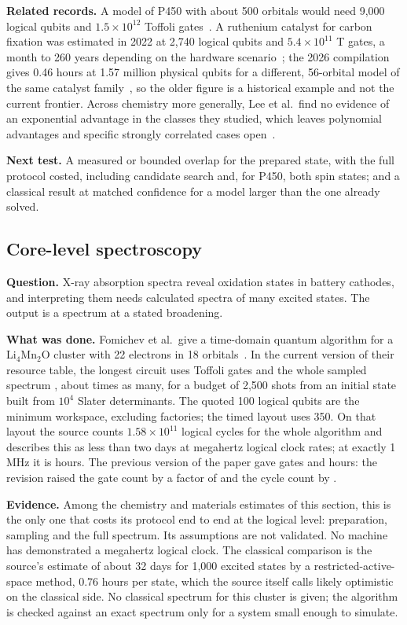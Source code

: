 \documentclass[10pt,a4paper]{article}
\begin{document}
\textbf{Related records.} A model of P450 with about 500 orbitals would need 9{,}000 logical qubits and $1.5\times10^{12}$ Toffoli gates~\cite{goings2022}. A ruthenium catalyst for carbon fixation was estimated in 2022 at 2{,}740 logical qubits and $5.4\times10^{11}$ T gates, a month to 260 years depending on the hardware scenario~\cite{beverland2022}; the 2026 compilation gives 0.46 hours at 1.57 million physical qubits for a different, 56-orbital model of the same catalyst family~\cite{low2026dense}, so the older figure is a historical example and not the current frontier. Across chemistry more generally, Lee et al.\ find no evidence of an exponential advantage in the classes they studied, which leaves polynomial advantages and specific strongly correlated cases open~\cite{lee2023}.

\textbf{Next test.} A measured or bounded overlap for the prepared state, with the full protocol costed, including candidate search and, for P450, both spin states; and a classical result at matched confidence for a model larger than the one already solved.

\subsection{Core-level spectroscopy}
\label{sec:xas}
\textbf{Question.} X-ray absorption spectra reveal oxidation states in battery cathodes, and interpreting them needs calculated spectra of many excited states. The output is a spectrum at a stated broadening.

\textbf{What was done.} Fomichev et al.\ give a time-domain quantum algorithm for a Li$_4$Mn$_2$O cluster with 22 electrons in 18 orbitals~\cite{fomichev2025}. In the current version of their resource table, the longest circuit uses \xasCirc{} Toffoli gates and the whole sampled spectrum \xasAlg{}, about \xasCircuits{} times as many, for a budget of 2{,}500 shots from an initial state built from $10^4$ Slater determinants. The quoted 100 logical qubits are the minimum workspace, excluding factories; the timed layout uses 350. On that layout the source counts $1.58\times10^{11}$ logical cycles for the whole algorithm and describes this as less than two days at megahertz logical clock rates; at exactly 1\,MHz it is \xasHours{} hours. The previous version of the paper gave \xasAlgOld{} gates and \xasHoursOld{} hours: the revision raised the gate count by a factor of \xasGateRatio{} and the cycle count by \xasCycleRatio.

\textbf{Evidence.} Among the chemistry and materials estimates of this section, this is the only one that costs its protocol end to end at the logical level: preparation, sampling and the full spectrum. Its assumptions are not validated. No machine has demonstrated a megahertz logical clock. The classical comparison is the source's estimate of about 32 days for 1{,}000 excited states by a restricted-active-space method, 0.76 hours per state, which the source itself calls likely optimistic on the classical side. No classical spectrum for this cluster is given; the algorithm is checked against an exact spectrum only for a system small enough to simulate.
\end{document}
